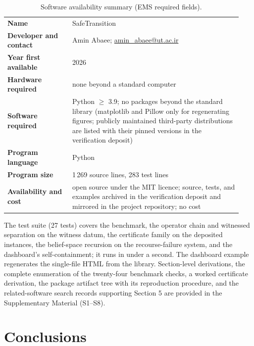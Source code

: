 \documentclass[3p,11pt]{elsarticle}
\begin{document}
\begin{table}[h]
\centering
\small
\begin{tabular}{@{}p{0.26\linewidth}p{0.68\linewidth}@{}}
\toprule
\textbf{Name} & SafeTransition \\
\textbf{Developer and contact} & Amin Abaee;
\href{mailto:amin_abaee@ut.ac.ir}{amin\_abaee@ut.ac.ir} \\
\textbf{Year first available} & 2026 \\
\textbf{Hardware required} & none beyond a standard computer \\
\textbf{Software required} & Python $\geq$ 3.9; no packages beyond the
standard library (matplotlib and Pillow only for regenerating figures;
publicly maintained third-party distributions are listed with their pinned
versions in the verification deposit) \\
\textbf{Program language} & Python \\
\textbf{Program size} & 1\,269 source lines, 283 test lines \\
\textbf{Availability and cost} & open source under the MIT licence; source,
tests, and examples archived in the verification deposit \citep{Deposit2026}
and mirrored in the project repository; no cost \\
\bottomrule
\end{tabular}
\caption{Software availability summary (EMS required fields).}
\label{tab:availability}
\end{table}

The test suite (27 tests) covers the benchmark, the operator chain and
witnessed separation on the witness datum, the certificate family on the
deposited instances, the belief-space recursion on the recourse-failure
system, and the dashboard's self-containment; it runs in under a second.
The dashboard example regenerates the single-file HTML from the library.
Section-level derivations, the complete enumeration of the twenty-four
benchmark checks, a worked certificate derivation, the package artifact
tree with its reproduction procedure, and the related-software search
records supporting Section 5 are provided in the Supplementary Material
(S1--S8).

\section{Conclusions}\label{sec:conclusions}
\end{document}
